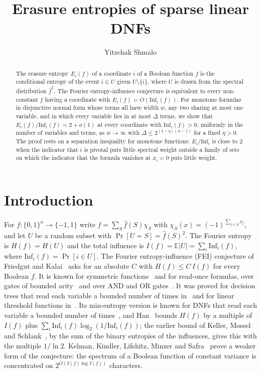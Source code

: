 \documentclass[11pt]{amsart}
\title{Erasure entropies of sparse linear DNFs}
\author{Yitzchak Shmalo}
\date{}
\theoremstyle{remark}
\newcommand{\Inf}{\mathrm{Inf}}
\newcommand{\E}{\mathbb{E}}
\begin{document}
\begin{abstract}
The erasure entropy $E_i(f)$ of a coordinate $i$ of a Boolean function $f$ is the conditional entropy of the event
$i\in U$ given $U\setminus\{i\}$, where $U$ is drawn from the spectral distribution $\hat f^2$. The Fourier
entropy-influence conjecture is equivalent to every non-constant $f$ having a coordinate with $E_i(f)=O(\Inf_i(f))$.
For monotone formulas in disjunctive normal form whose terms all have width $w$, any two sharing at most one variable,
and in which every variable lies in at most $\Delta$ terms, we show that $E_i(f)/\Inf_i(f)=2+o(1)$ at every coordinate
with $\Inf_i(f)>0$, uniformly in the number of variables and terms, as $w\to\infty$ with $\Delta\le2^{(1-\eta)(w-1)}$
for a fixed $\eta>0$. The proof rests on a separation inequality for monotone functions: $E_i/\Inf_i$ is close to $2$
when the indicator that $i$ is pivotal puts little spectral weight outside a family of sets on which the indicator
that the formula vanishes at $x_i=0$ puts little weight.
\end{abstract}


\maketitle

\section{Introduction}\label{sec:intro}

For $f\colon\{0,1\}^n\to\{-1,1\}$ write $f=\sum_S\hat f(S)\chi_S$ with $\chi_S(x)=(-1)^{\sum_{j\in S}x_j}$, and let $U$
be a random subset with $\Pr[U=S]=\hat f(S)^2$. The Fourier entropy is $H(f)=H(U)$ and the total influence is
$I(f)=\E|U|=\sum_i\Inf_i(f)$, where $\Inf_i(f)=\Pr[i\in U]$. The Fourier entropy-influence (FEI) conjecture of Friedgut
and Kalai~\cite{FK96} asks for an absolute $C$ with $H(f)\le C\,I(f)$ for every Boolean $f$. It is known for symmetric
functions~\cite{OWZ} and for read-once formulas, over gates of bounded arity~\cite{OT13} and over AND and OR
gates~\cite{CKLS}. It was proved for decision trees that read each variable a bounded number of times in~\cite{WWW} and for linear threshold
functions in~\cite{ShmLTF}. Its min-entropy
version is known for DNFs that read each variable a bounded number of times~\cite{Shalev,ACKSW}, and Han~\cite{Han} bounds $H(f)$ by a multiple of
$I(f)$ plus $\sum_i\Inf_i(f)\log_2(1/\Inf_i(f))$; the earlier bound of Keller, Mossel and Schlank~\cite[Claim~4.1]{KMS},
by the sum of the binary entropies of the influences, gives this with the multiple $1/\ln 2$. Kelman, Kindler, Lifshitz, Minzer and Safra~\cite{KKLMS} prove a
weaker form of the conjecture: the spectrum of a Boolean function of constant variance is concentrated on
$2^{O(I(f)\log I(f))}$ characters.
\end{document}
